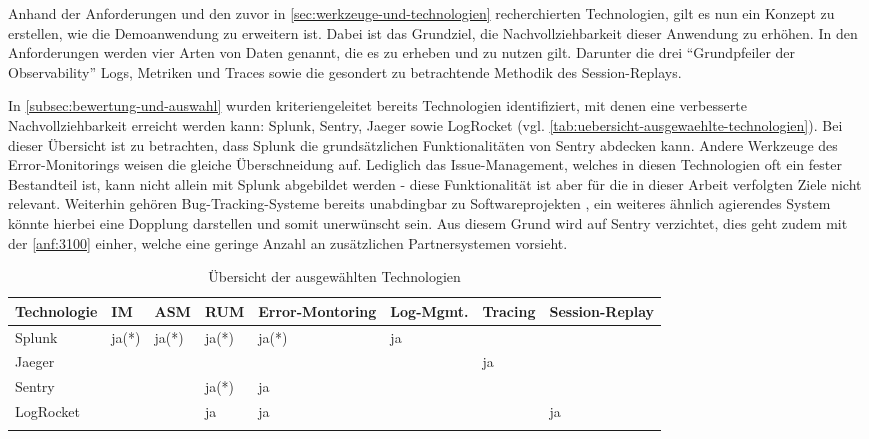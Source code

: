 % 

Anhand der Anforderungen und den zuvor in \autoref{sec:werkzeuge-und-technologien} recherchierten Technologien, gilt es nun ein Konzept zu erstellen, wie die Demoanwendung zu erweitern ist. Dabei ist das Grundziel, die Nachvollziehbarkeit dieser Anwendung zu erhöhen. In den Anforderungen werden vier Arten von Daten genannt, die es zu erheben und zu nutzen gilt. Darunter die drei \enquote{Grundpfeiler der Observability} Logs, Metriken und Traces sowie die gesondert zu betrachtende Methodik des Session-Replays.

In \autoref{subsec:bewertung-und-auswahl} wurden kriteriengeleitet bereits Technologien identifiziert, mit denen eine verbesserte Nachvollziehbarkeit erreicht werden kann: Splunk, Sentry, Jaeger sowie LogRocket (vgl. \autoref{tab:uebersicht-ausgewaehlte-technologien}). Bei dieser Übersicht ist zu betrachten, dass Splunk die grundsätzlichen Funktionalitäten von Sentry abdecken kann. Andere Werkzeuge des Error-Monitorings weisen die gleiche Überschneidung auf. Lediglich das Issue-Management, welches in diesen Technologien oft ein fester Bestandteil ist, kann nicht allein mit Splunk abgebildet werden - diese Funktionalität ist aber für die in dieser Arbeit verfolgten Ziele nicht relevant. Weiterhin gehören Bug-Tracking-Systeme bereits unabdingbar zu Softwareprojekten \cite{BugzillaITrackerAndOtherBugTrackers}, ein weiteres ähnlich agierendes System könnte hierbei eine Dopplung darstellen und somit unerwünscht sein. Aus diesem Grund wird auf Sentry verzichtet, dies geht zudem mit der \autoref{anf:3100} einher, welche eine geringe Anzahl an zusätzlichen Partnersystemen vorsieht.

\begingroup
\centering
\setlength{\LTleft}{-20cm plus -1fill}
\setlength{\LTright}{\LTleft}
\begin{longtable}{|p{4.10cm}|p{0.90cm}|p{0.90cm}|p{1.9cm}|p{1.75cm}|p{1.5cm}|p{1.4cm}|p{1.3cm}|}
\hline
Technologie & IM & ASM & RUM & Error-Montoring & Log-Mgmt. & Tracing & Session-Replay \\
\endhead
\hline
Splunk & ja(*) & ja(*) & ja(*) & ja(*) & ja &  &  \\
\hline
Jaeger &  &  &  &  &  & ja &  \\
\hline
Sentry &  &  & ja(*) & ja &  &  &  \\
\hline
LogRocket &  &  & ja & ja &  &  & ja \\
\hline
\caption{Übersicht der ausgewählten Technologien}
\label{tab:uebersicht-ausgewaehlte-technologien}
\end{longtable}
\endgroup

